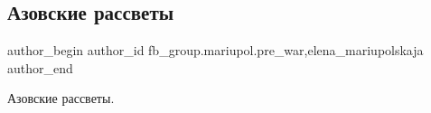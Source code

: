  
 
 
 
 

\subsection{Азовские рассветы}
\label{sec:26_01_2023.fb.fb_group.mariupol.pre_war.2.azovskie_rassveti}
 
\ifcmt
 author_begin
   author_id fb_group.mariupol.pre_war,elena_mariupolskaja
 author_end
\fi

Азовские рассветы.

